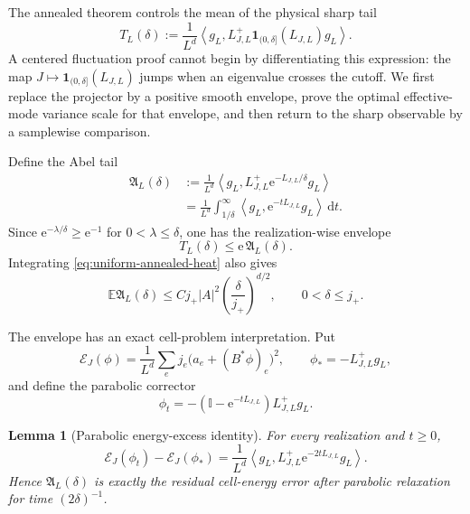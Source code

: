 \documentclass[11pt]{article}
\newtheorem{lemma}[theorem]{Lemma}
\theoremstyle{definition}
\theoremstyle{remark}
\newcommand{\e}{\mathrm e}
\newcommand{\Id}{\mathbb I}
\newcommand{\E}{\mathbb E}
\newcommand{\cE}{\mathcal E}
\newcommand{\ip}[2]{\left\langle #1,#2\right\rangle}
\newcommand{\abs}[1]{\left\lvert #1\right\rvert}
\newcommand{\dd}{\,\mathrm d}
\begin{document}
The annealed theorem controls the mean of the physical sharp tail
\begin{equation}
 T_L(\delta)
 :=\frac1{L^d}\ip{g_L}{L_{J,L}^+
 \bm{1}_{(0,\delta]}(L_{J,L})g_L}.
 \label{eq:sharp-tail-definition}
\end{equation}
A centered fluctuation proof cannot begin by differentiating this expression:
the map $J\mapsto\bm 1_{(0,\delta]}(L_{J,L})$ jumps when an eigenvalue crosses
the cutoff.  We first replace the projector by a positive smooth envelope, prove
the optimal effective-mode variance scale for that envelope, and then return to
the sharp observable by a samplewise comparison.

Define the Abel tail
\begin{align}
 \mathfrak A_L(\delta)
 &:=\frac{1}{L^d}\ip{g_L}{L_{J,L}^+
 \e^{-L_{J,L}/\delta}g_L}
 \label{eq:Abel-tail-definition}\\
 &= \frac{1}{L^d}\int_{1/\delta}^{\infty}
 \ip{g_L}{\e^{-tL_{J,L}}g_L}\dd t.
 \label{eq:Abel-tail-heat}
\end{align}
Since $\e^{-\lambda/\delta}\ge\e^{-1}$ for
$0<\lambda\le\delta$, one has the realization-wise envelope
\begin{equation}
 \boxed{T_L(\delta)\le \e\,\mathfrak A_L(\delta).}
 \label{eq:Abel-dominates-sharp}
\end{equation}
Integrating \eqref{eq:uniform-annealed-heat} also gives
\begin{equation}
 \E\mathfrak A_L(\delta)
 \le Cj_+\abs A^2
 \left(\frac{\delta}{j_+}\right)^{d/2},
 \qquad 0<\delta\le j_+.
 \label{eq:Abel-mean}
\end{equation}

The envelope has an exact cell-problem interpretation.  Put
\begin{equation}
 \cE_J(\phi)=\frac{1}{L^d}
 \sum_ej_e\bigl(a_e+(B^*\phi)_e\bigr)^2,
 \qquad
 \phi_*=-L_{J,L}^+g_L,
\end{equation}
and define the parabolic corrector
\begin{equation}
 \phi_t=-(\Id-\e^{-tL_{J,L}})L_{J,L}^+g_L.
\end{equation}

\begin{lemma}[Parabolic energy-excess identity]
\label{lem:parabolic-energy-excess}
For every realization and $t\ge0$,
\begin{equation}
 \boxed{
 \cE_J(\phi_t)-\cE_J(\phi_*)
 =\frac{1}{L^d}\ip{g_L}{L_{J,L}^+
 \e^{-2tL_{J,L}}g_L}.}
 \label{eq:parabolic-energy-excess}
\end{equation}
Hence $\mathfrak A_L(\delta)$ is exactly the residual cell-energy error after
parabolic relaxation for time $(2\delta)^{-1}$.
\end{lemma}
\end{document}
